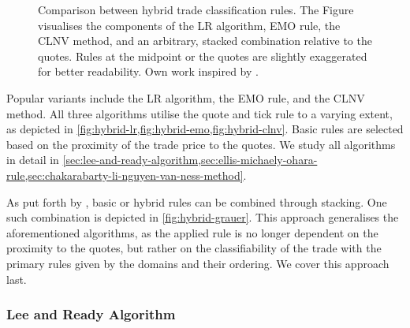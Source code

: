 \begin{figure}[ht!]
    \hfill
    \hfill\null
    \caption[Comparison Between Hybrid Trade Classification Rules]{Comparison between hybrid trade classification rules. The Figure visualises the components of the \acrshort{LR} algorithm, \acrshort{EMO} rule, the \acrshort{CLNV} method, and an arbitrary, stacked combination relative to the quotes. Rules at the midpoint or the quotes are slightly exaggerated for better readability. Own work inspired by \textcite[][167]{poppeSensitivityVPINChoice2016}.}
    \label{fig:hybrid-algorithms}
\end{figure}

Popular variants include the \gls{LR} algorithm, the \gls{EMO} rule, and the \gls{CLNV} method. All three algorithms utilise the quote and tick rule to a varying extent, as depicted in \cref{fig:hybrid-lr,fig:hybrid-emo,fig:hybrid-clnv}. Basic rules are selected based on the proximity of the trade price to the quotes. We study all algorithms in detail in \cref{sec:lee-and-ready-algorithm,sec:ellis-michaely-ohara-rule,sec:chakarabarty-li-nguyen-van-ness-method}.


As put forth by \textcite[][18]{grauerOptionTradeClassification2022}, basic or hybrid rules can be combined through stacking. One such combination is depicted in \cref{fig:hybrid-grauer}. This approach generalises the aforementioned algorithms, as the applied rule is no longer dependent on the proximity to the quotes, but rather on the classifiability of the trade with the primary rules given by the domains and their ordering. We cover this approach last.

\subsubsection{Lee and Ready Algorithm}\label{sec:lee-and-ready-algorithm}

